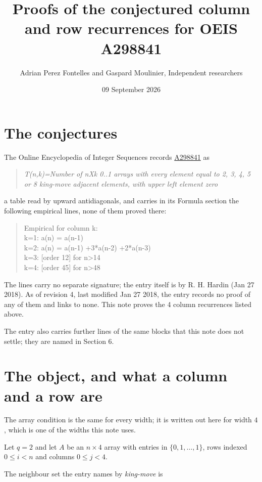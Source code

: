 \documentclass[11pt]{article}
\title{Proofs of the conjectured column and row recurrences for OEIS A298841}
\author{Adrian Perez Fontelles and Gaspard Moulinier, Independent researchers}
\date{09 September 2026}
\theoremstyle{definition}
\begin{document}
\maketitle
\section{The conjectures}

The Online Encyclopedia of Integer Sequences records \href{https://oeis.org/A298841}{A298841} as

\begin{quote}\itshape T(n,k)=Number of nXk 0..1 arrays with every element equal to 2, 3, 4, 5 or 8 king-move adjacent elements, with upper left element zero\end{quote}

a table read by upward antidiagonals, and carries in its Formula section the following empirical lines, none of them proved there:

\begin{quote}\ttfamily Empirical for column k:\\
k=1: a(n) = a(n-1)\\k=2: a(n) = a(n-1) +3*a(n-2) +2*a(n-3)\\k=3: [order 12] for n>14\\k=4: [order 45] for n>48\end{quote}

The lines carry no separate signature; the entry itself is by R. H. Hardin (Jan 27 2018). As of revision 4, last modified Jan 27 2018, the entry records no proof of any of them and links to none. This note proves the 4 column recurrences listed above.

The entry also carries further lines of the same blocks that this note does not settle; they are named in Section 6.

\section{The object, and what a column and a row are}

The array condition is the same for every width; it is written out here for width $4$, which is one of the widths this note uses.

Let $q = 2$ and let $A$ be an $n \times 4$ array with entries in $\{0,1,\dots,1\}$, rows indexed $0 \le i < n$ and columns $0 \le j < 4$.

The neighbour set the entry names by {\itshape king-move} is
\end{document}
